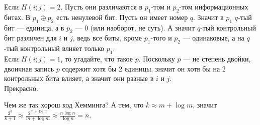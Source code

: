 \documentclass{article}
\begin{document}
\begin{itemize}
\begin{Proof}
            Если $H(i;j)=2$. Пусть они различаются в $p_1$-том и $p_2$-том информационных битах. В $p_1\oplus p_2$ есть ненулевой бит. Пусть он имеет номер $q$. Значит в $p_1$ $q$-тый бит --- единица, а в $p_2$ --- 0 (или наоборот, не суть). А значит $q$-тый контрольный бит различен для $i$ и $j$, ведь все биты, кроме $p_1$-того и $p_2$ --- одинаковые, а на $q$-тый контрольный влияет только $p_1$.\\
            Если $H(i;j)=1$, то угадайте, что такое $p$. Поскольку $p$ --- не степень двойки, двоичная запись $p$ содержит хотя бы 2 единицы, значит он хотя бы на 2 контрольных бита влияет, а значит они разные в $i$ и $j$.\\
            Прекрасно.
        \end{Proof}
        \begin{Comment}
            Чем же так хорош код Хемминга? А тем, что $k\approx m+\log m$, значит $\frac{2^k}{k+1}\approx\frac{2^{m+\log m}}{m+\log m}\approx\frac{n\log n}{\log n}=n$.
        \end{Comment}
    \end{itemize}
\end{document}
